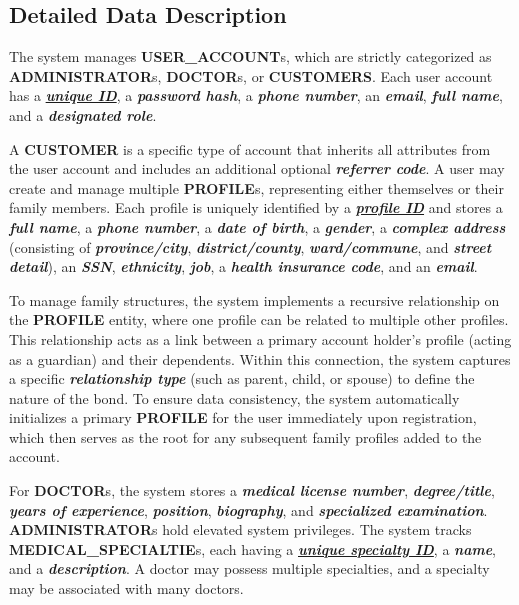 \subsection{Detailed Data Description}
\begin{sloppypar}
    The system manages \textbf{USER\_ACCOUNT}s, which are strictly categorized as \textbf{ADMINISTRATOR}s, \textbf{DOCTOR}s, or \textbf{CUSTOMERS}. Each user account has a \textbf{\textit{\uline{unique ID}}}, a \textbf{\textit{password hash}}, a \textbf{\textit{phone number}}, an \textbf{\textit{email}}, \textbf{\textit{full name}}, and a \textbf{\textit{designated role}}.

\par A \textbf{CUSTOMER} is a specific type of account that inherits all attributes from the user account and includes an additional optional \textbf{\textit{referrer code}}. A user may create and manage multiple \textbf{PROFILE}s, representing either themselves or their family members. Each profile is uniquely identified by a \textbf{\textit{\uline{profile ID}}} and stores a \textbf{\textit{full name}}, a \textbf{\textit{phone number}}, a \textbf{\textit{date of birth}}, a \textbf{\textit{gender}}, a \textbf{\textit{complex address}} (consisting of \textbf{\textit{province/city}}, \textbf{\textit{district/county}}, \textbf{\textit{ward/commune}}, and \textbf{\textit{street detail}}), an \textbf{\textit{SSN}}, \textbf{\textit{ethnicity}}, \textbf{\textit{job}}, a \textbf{\textit{health insurance code}}, and an \textbf{\textit{email}}.

\par To manage family structures, the system implements a recursive relationship on the \textbf{PROFILE} entity, where one profile can be related to multiple other profiles. This relationship acts as a link between a primary account holder’s profile (acting as a guardian) and their dependents. Within this connection, the system captures a specific \textbf{\textit{relationship type}} (such as parent, child, or spouse) to define the nature of the bond. To ensure data consistency, the system automatically initializes a primary \textbf{PROFILE} for the user immediately upon registration, which then serves as the root for any subsequent family profiles added to the account.

\par For \textbf{DOCTOR}s, the system stores a \textbf{\textit{medical license number}}, \textbf{\textit{degree/title}}, \textbf{\textit{years of experience}}, \textbf{\textit{position}}, \textbf{\textit{biography}}, and \textbf{\textit{specialized examination}}. \textbf{ADMINISTRATOR}s hold elevated system privileges. The system tracks \textbf{MEDICAL\_SPECIALTIE}s, each having a \textbf{\textit{\uline{unique specialty ID}}}, a \textbf{\textit{name}}, and a \textbf{\textit{description}}. A doctor may possess multiple specialties, and a specialty may be associated with many doctors.


\end{sloppypar}
